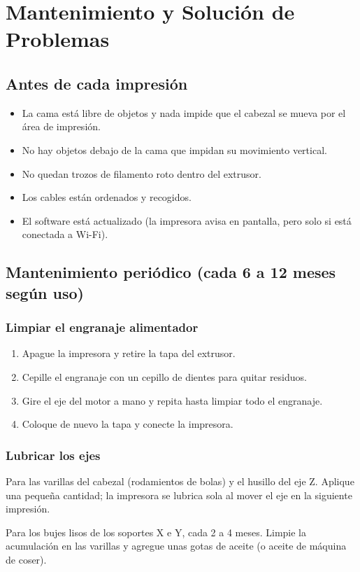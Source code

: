 \chapter{Mantenimiento y Solución de Problemas}

\section{Antes de cada impresión}

\begin{itemize}
    \item La cama está libre de objetos y nada impide que el cabezal se mueva por el área de impresión.
    \item No hay objetos debajo de la cama que impidan su movimiento vertical.
    \item No quedan trozos de filamento roto dentro del extrusor.
    \item Los cables están ordenados y recogidos.
    \item El software está actualizado (la impresora avisa en pantalla, pero solo si está conectada a Wi-Fi).
\end{itemize}

\section{Mantenimiento periódico (cada 6 a 12 meses según uso)}

\subsection{Limpiar el engranaje alimentador}

\begin{enumerate}
    \item Apague la impresora y retire la tapa del extrusor.
    \item Cepille el engranaje con un cepillo de dientes para quitar residuos.
    \item Gire el eje del motor a mano y repita hasta limpiar todo el engranaje.
    \item Coloque de nuevo la tapa y conecte la impresora.
\end{enumerate}

\subsection{Lubricar los ejes}

\begin{description}[leftmargin=2.8cm,style=nextline]
    \item[Grasa blanca de litio] Para las varillas del cabezal (rodamientos de bolas) y el husillo del eje Z. Aplique una pequeña cantidad; la impresora se lubrica sola al mover el eje en la siguiente impresión.
    \item[Aceite 3 en 1] Para los bujes lisos de los soportes X e Y, cada 2 a 4 meses. Limpie la acumulación en las varillas y agregue unas gotas de aceite (o aceite de máquina de coser).
\end{description}

